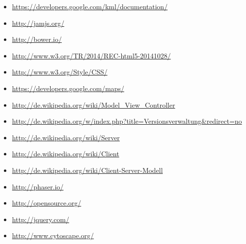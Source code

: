\documentclass[11pt,a4paper]{article}
\begin{document}
\begin{itemize}
\item \url{https://developers.google.com/kml/documentation/}
\item \url{http://jamjs.org/}
\item \url{http://bower.io/}
\item \url{http://www.w3.org/TR/2014/REC-html5-20141028/}
\item \url{http://www.w3.org/Style/CSS/}
\item \url{https://developers.google.com/maps/}
\item \url{http://de.wikipedia.org/wiki/Model_View_Controller}
\item \url{http://de.wikipedia.org/w/index.php?title=Versionsverwaltung&redirect=no}
\item \url{http://de.wikipedia.org/wiki/Server}
\item \url{http://de.wikipedia.org/wiki/Client}
\item \url{http://de.wikipedia.org/wiki/Client-Server-Modell}
\item \url{http://phaser.io/}
\item \url{http://opensource.org/}
\item \url{http://jquery.com/}
\item \url{http://www.cytoscape.org/}

\end{itemize}
\end{document}
